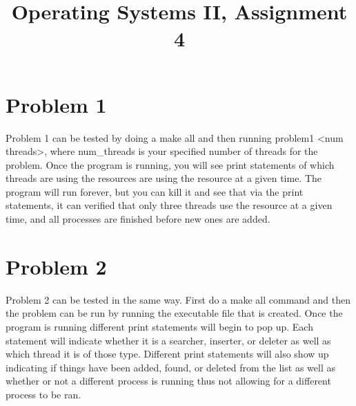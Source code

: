 \documentclass[letterpaper,onecolumn,10pt,titlepage]{IEEEtran}
\begin{document}
\begin{titlepage}
\title{Operating Systems II, Assignment 4}
\author
{
}
	\maketitle	
	\begin{abstract}
	 
	\end{abstract}	
\end{titlepage}

\newpage

\section{Problem 1}
\par Problem 1 can be tested by doing a make all and then running problem1 <num threads>, where num\_threads is your specified number of threads for the problem. Once the program is running, you will see print statements of which threads are using the resources are using the resource at a given time. The program will run forever, but you can kill it and see that via the print statements, it can verified that only three threads use the resource at a given time, and all processes are finished before new ones are added. 

\section{Problem 2}
\par Problem 2 can be tested in the same way. First do a make all command and then the problem can be run by running the executable file that is created. Once the program is running different print statements will begin to pop up. Each statement will indicate whether it is a searcher, inserter, or deleter as well as which thread it is of those type. Different print statements will also show up indicating if things have been added, found, or deleted from the list as well as whether or not a different process is running thus not allowing for a different process to be ran.
\end{document}
